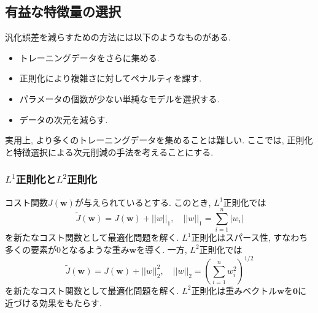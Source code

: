 \documentclass[uplatex]{jsarticle}
\theoremstyle{definition}
\numberwithin{equation}{section}
\newcommand{\norm}[1]{\left|\left|#1\right|\right|}
\begin{document}
\subsection{有益な特徴量の選択}
汎化誤差を減らすための方法には以下のようなものがある.
\begin{itemize}
    \item
    トレーニングデータをさらに集める.
    \item
    正則化により複雑さに対してペナルティを課す.
    \item
    パラメータの個数が少ない単純なモデルを選択する.
    \item
    データの次元を減らす.
\end{itemize}
実用上, より多くのトレーニングデータを集めることは難しい.
ここでは, 正則化と特徴選択による次元削減の手法を考えることにする.

\subsubsection{$L^{1}$正則化と$L^{2}$正則化}
コスト関数$J(\bm{w})$が与えられているとする.
このとき, $L^{1}$正則化では
\begin{equation}
    \tilde{J}(\bm{w}) = J(\bm{w}) + \norm{w}_{1}, \quad \norm{w}_{1} = \sum_{i = 1}^{n} |w_{i}|
\end{equation}
を新たなコスト関数として最適化問題を解く.
$L^{1}$正則化はスパース性, すなわち多くの要素が$0$となるような重み$\bm{w}$を導く.
一方, $L^{2}$正則化では
\begin{equation}
    \tilde{J}(\bm{w}) = J(\bm{w}) + \norm{w}_{2}^{2}, \quad \norm{w}_{2} = \left(\sum_{i = 1}^{n} w_{i}^{2}\right)^{1/2}
\end{equation}
を新たなコスト関数として最適化問題を解く.
$L^{2}$正則化は重みベクトル$\bm{w}$を$\bm{0}$に近づける効果をもたらす.
\end{document}

